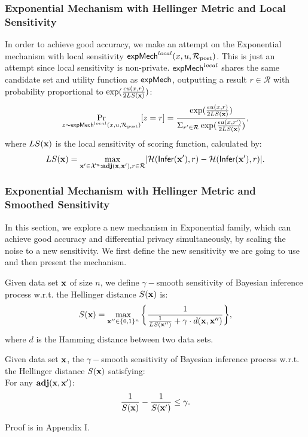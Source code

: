 \documentclass{article}
\begin{document}
\subsubsection{Exponential Mechanism with Hellinger Metric and Local Sensitivity}
\label{subsec_emls}
In order to achieve good accuracy, we make an attempt on the Exponential mechanism with local sensitivity $\mathsf{expMech}^{local}(x,u,\mathcal{R}_{\textup{post}})$. This is just an attempt since local sensitivity is non-private. $\mathsf{expMech}^{local}$ shares the same candidate set and utility function as $\mathsf{expMech}$, outputting a result $r \in \mathcal{R}$ with probability proportional to $\exp(\frac{\epsilon u(x,r)}{2 LS(\textbf{x})})$:
\[
\underset{z \thicksim \mathsf{expMech}^{local}(x,u,\mathcal{R}_{\textup{post}})}{\Pr}[z=r] = \frac
{\exp(\frac{\epsilon u(x,r)}{2 LS(\textbf{x})})}
{\Sigma_{r' \in \mathcal{R}}\exp(\frac{\epsilon u(x,r')}{2 LS(\textbf{x})})},
\]
where $LS(\textbf{x})$ is the local sensitivity of scoring function, calculated by:
\begin{equation*}
LS(\textbf{x})=\max_{\textbf{x}' \in \mathcal{X}^n: \\ \textbf{adj}(\textbf{x},\textbf{x}'), r\in \mathcal{R}}\lvert \mathcal{H}(\mathsf{Infer}(\textbf{x}'), r) - \mathcal{H}(\mathsf{Infer}(\textbf{x}'), r)\rvert.
\end{equation*}


\subsubsection{Exponential Mechanism with Hellinger Metric and Smoothed Sensitivity}
\label{subsec_hexpmech}
In this section, we explore a new mechanism in Exponential family, which can achieve good accuracy and differential privacy simultaneously, by scaling the noise to a new sensitivity. We first define the new sensitivity we are going to use and then present the mechanism.
\begin{definition}
\label{def_gamma_smooth}
Given data set $\textbf{x}$ of size $n$, we define $\gamma -$smooth sensitivity of Bayesian inference process w.r.t. the Hellinger distance $S(\textbf{x})$ is:
\begin{equation}
  \label{eq_smooth}
   S(\textbf{x})=\max_{\textbf{x}'' \in \{0,1\}^{n}}\bigg \{ \frac{1}{\frac{1}{LS(\textbf{x}'')} +\gamma \cdot d(\textbf{x},\textbf{x}'')} \bigg \},
\end{equation}
where $d$ is the Hamming distance between two data sets.
\end{definition}

\begin{thm}
\label{thm_gamma_smooth}
Given data set $\textbf{x}$, the $\gamma -$smooth sensitivity of Bayesian inference process w.r.t. the Hellinger distance $S(\textbf{x})$ satisfying:\\
For any $\textbf{adj}(\textbf{x},\textbf{x}')$:
\begin{equation}
\label{eq_gamma_smooth}
\frac{1}{S(\textbf{x})} - \frac{1}{S(\textbf{x}')} \leq \gamma.
\end{equation}

\end{thm}
Proof is in Appendix I.
\end{document}
